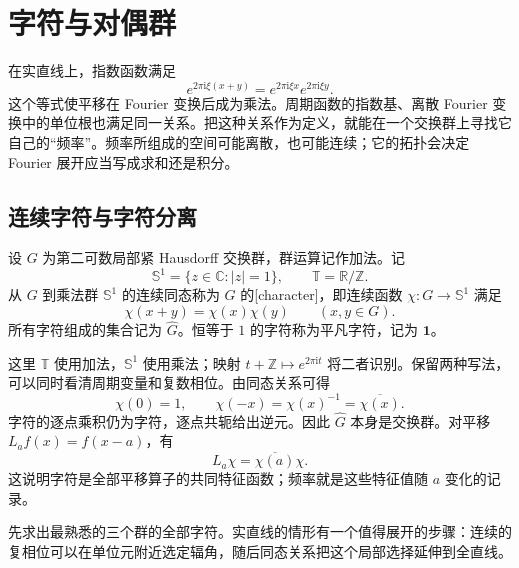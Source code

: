 \section{字符与对偶群}
\label{b2:sec:I203}

在实直线上，指数函数满足
\[
 e^{2\pi\mathrm i\xi(x+y)}=e^{2\pi\mathrm i\xi x}e^{2\pi\mathrm i\xi y}.
\]
这个等式使平移在 Fourier 变换后成为乘法。周期函数的指数基、离散 Fourier 变换中的单位根也满足同一关系。把这种关系作为定义，就能在一个交换群上寻找它自己的“频率”。频率所组成的空间可能离散，也可能连续；它的拓扑会决定 Fourier 展开应当写成求和还是积分。

\subsection{连续字符与字符分离}
\label{b2:subsec:I20301}

\begin{definition}[连续字符]
\label{b2:def:I3-character}
设 \(G\) 为第二可数局部紧 Hausdorff 交换群，群运算记作加法。记
\[
 \mathbb S^1=\{z\in\mathbb C:|z|=1\},\qquad
 \mathbb T=\mathbb R/\mathbb Z.
\]
从 \(G\) 到乘法群 \(\mathbb S^1\) 的连续同态称为 \(G\) 的[character]，即连续函数 \(\chi:G\to\mathbb S^1\) 满足
\[
 \chi(x+y)=\chi(x)\chi(y)\qquad(x,y\in G).
\]
所有字符组成的集合记为 \(\widehat G\)。恒等于 \(1\) 的字符称为平凡字符，记为 \(\mathbf1\)。
\end{definition}

这里 \(\mathbb T\) 使用加法，\(\mathbb S^1\) 使用乘法；映射 \(t+\mathbb Z\mapsto e^{2\pi\mathrm it}\) 将二者识别。保留两种写法，可以同时看清周期变量和复数相位。由同态关系可得
\[
 \chi(0)=1,\qquad \chi(-x)=\chi(x)^{-1}=\overline{\chi(x)}.
\]
字符的逐点乘积仍为字符，逐点共轭给出逆元。因此 \(\widehat G\) 本身是交换群。对平移 \(L_af(x)=f(x-a)\)，有
\[
 L_a\chi=\overline{\chi(a)}\chi.
\]
这说明字符是全部平移算子的共同特征函数；频率就是这些特征值随 \(a\) 变化的记录。

先求出最熟悉的三个群的全部字符。实直线的情形有一个值得展开的步骤：连续的复相位可以在单位元附近选定辐角，随后同态关系把这个局部选择延伸到全直线。

